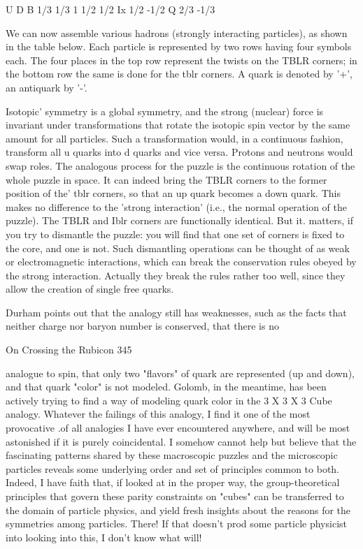                               U      D
                      B      1/3     1/3
                      1      1/2     1/2
                      Ix     1/2     -1/2
                      Q      2/3     -1/3

     We can now assemble various hadrons (strongly interacting particles), as
     shown in the table below. Each particle is represented by two rows having
     four symbols each. The four places in the top row represent the twists on the
     TBLR corners; in the bottom row the same is done for the tblr corners. A
     quark is denoted by '+', an antiquark by '-'.




       Isotopic' symmetry is a global symmetry, and the strong (nuclear) force is
     invariant under transformations that rotate the isotopic spin vector by the
     same amount for all particles. Such a transformation would, in a continuous
     fashion, transform all u quarks into d quarks and vice versa. Protons and
     neutrons would swap roles. The analogous process for the puzzle is the
     continuous rotation of the whole puzzle in space. It can indeed bring the
     TBLR corners to the former position of the' tblr corners, so that an up quark
     becomes a down quark.
       This makes no difference to the 'strong interaction' (i.e., the normal
     operation of the puzzle). The TBLR and Iblr corners are functionally
     identical. But it. matters, if you try to dismantle the puzzle: you will find that
     one set of corners is fixed to the core, and one is not. Such dismantling
     operations can be thought of as weak or electromagnetic interactions, which
     can break the conservation rules obeyed by the strong interaction. Actually
     they break the rules rather too well, since they allow the creation of single
     free quarks.

     Durham points out that the analogy still has weaknesses, such as the facts
     that neither charge nor baryon number is conserved, that there is no

On Crossing the Rubicon                                                               345

analogue to spin, that only two "flavors" of quark are represented (up and down),
and that quark "color" is not modeled. Golomb, in the meantime, has been actively
trying to find a way of modeling quark color in the 3 X 3 X 3 Cube analogy.
Whatever the failings of this analogy, I find it one of the most provocative .of all
analogies I have ever encountered anywhere, and will be most astonished if it is
purely coincidental. I somehow cannot help but believe that the fascinating
patterns shared by these macroscopic puzzles and the microscopic particles reveals
some underlying order and set of principles common to both. Indeed, I have faith
that, if looked at in the proper way, the group-theoretical principles that govern
these parity constraints on "cubes" can be transferred to the domain of particle
physics, and yield fresh insights about the reasons for the symmetries among
particles. There! If that doesn't prod some particle physicist into looking into this, I
don't know what will!

